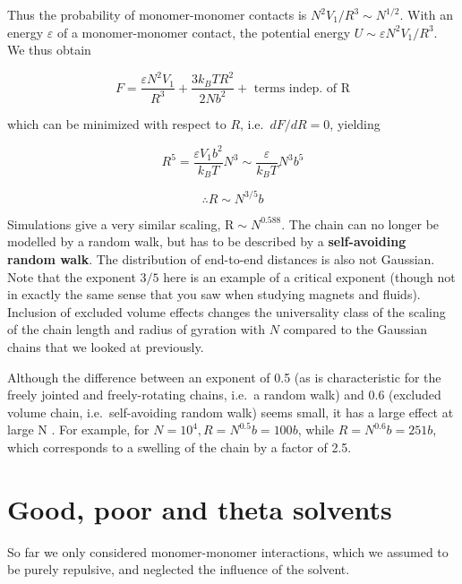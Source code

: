 \documentclass[
  letterpaper,
  enabledeprecatedfontcommands]{report}
\begin{document}
Thus the probability of monomer-monomer contacts is
\(N^{2} V_{1} / R^{3} \sim N^{1 / 2}\). With an energy \(\varepsilon\)
of a monomer-monomer contact, the potential energy
\(U \sim \varepsilon N^{2} V_{1} / R^{3}\). We thus obtain

\[
F=\frac{\varepsilon N^{2} V_{1}}{R^{3}}+\frac{3 k_{B} T R^{2}}{2 N b^{2}}+\text { terms indep. of } \mathrm{R}
\]

which can be minimized with respect to \(R\), i.e.~\(d F / d R=0\),
yielding

\[R^{5}=\frac{\varepsilon V_{1} b^{2}}{k_{B} T} N^{3} \sim \frac{\varepsilon}{k_{B} T} N^{3} b^{5}\]

\[ \therefore R \sim N^{3 / 5} b\]

Simulations give a very similar scaling, \(\mathrm{R} \sim N^{0.588}\).
The chain can no longer be modelled by a random walk, but has to be
described by a \textbf{self-avoiding random walk}. The distribution of
end-to-end distances is also not Gaussian. Note that the exponent
\(3/5\) here is an example of a critical exponent (though not in exactly
the same sense that you saw when studying magnets and fluids). Inclusion
of excluded volume effects changes the universality class of the scaling
of the chain length and radius of gyration with \(N\) compared to the
Gaussian chains that we looked at previously.

Although the difference between an exponent of 0.5 (as is characteristic
for the freely jointed and freely-rotating chains, i.e.~a random walk)
and 0.6 (excluded volume chain, i.e.~self-avoiding random walk) seems
small, it has a large effect at large N . For example, for
\(N=10^{4}, R=N^{0.5} b=100 b\), while \(R=N^{0.6} b=251 b\), which
corresponds to a swelling of the chain by a factor of 2.5.


\section{Good, poor and theta
solvents}\label{good-poor-and-theta-solvents}

So far we only considered monomer-monomer interactions, which we assumed
to be purely repulsive, and neglected the influence of the solvent.
\end{document}

